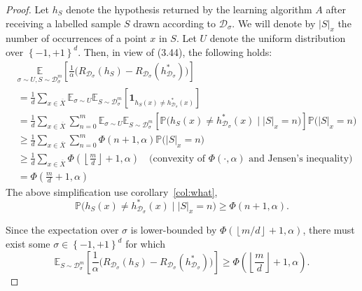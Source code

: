 \begin{proof}
Let $h_{S}$ denote the hypothesis returned by the learning algorithm $A$ after receiving a labelled sample $S$ drawn according to $\mathcal{D}_{\sigma}$. We will denote by $|S|_{x}$ the number of occurrences of a point $x$ in $S$. Let $U$ denote the uniform distribution over $\left\{-1,+1\right\}^{d}$. Then, in view of (3.44), the following holds:
\begin{align}
    &\underset{{\sigma\sim U,S\sim\mathcal{D}_{\sigma}^{m}}}{\mathbb{E}}\left[
\frac{1}{\alpha}\bigl(R_{\mathcal{D}_{\sigma}}(h_S)-R_{\mathcal{D}_{\sigma}}(h^{\ast}_{\mathcal{D}_{\sigma}})\bigr)
\right]\\
&= \frac{1}{d}\sum_{x\in\overline{X}}
\mathbb{E}_{\sigma\sim U}\mathbb{E}_{S\sim\mathcal{D}_{\sigma}^{m}}
\left[ \mathbf{1}_{h_S(x)\neq h^{\ast}_{\mathcal{D}_{\sigma}}(x)} \right]\\
& = \frac{1}{d}\sum_{x\in\overline{X}}
\sum_{n=0}^{m}\mathbb{E}_{\sigma\sim U}\mathbb{E}_{S\sim\mathcal{D}_{\sigma}^{m}}
\left[ \mathbb{P}\bigl(h_S(x)\neq h^{\ast}_{\mathcal{D}_{\sigma}}(x)\mid |S|_{x}=n\bigr)\right]\mathbb{P}\bigl(|S|_{x}=n\bigr)\\
& \ge \frac{1}{d}\sum_{x\in\overline{X}}\sum_{n=0}^{m}\Phi\left(n+1,\alpha\right)\mathbb{P}\bigl(|S|_{x}=n\bigr)\\
&\ge \frac{1}{d}\sum_{x\in\overline{X}}\Phi\left(\left\lfloor\frac{m}{d}\right\rfloor+1,\alpha\right)
\quad\text{(convexity of }\Phi(\cdot,\alpha)\text{ and Jensen's inequality)}\\
& = \Phi\left(\frac{m}{d}+1,\alpha\right)
\end{align}
The above simplification use corollary~\ref{col:what},
\begin{equation}
\mathbb{P}\bigl(h_S(x)\neq h^{\ast}_{\mathcal{D}_{\sigma}}(x)\mid |S|_{x}=n\bigr)
\ge \Phi\left(n+1,\alpha\right).
\end{equation}

Since the expectation over $\sigma$ is lower-bounded by $\Phi\left(\left\lfloor m/d\right\rfloor+1,\alpha\right)$, there must exist some $\sigma\in\left\{-1,+1\right\}^{d}$ for which
\begin{equation}
\mathbb{E}_{S\sim\mathcal{D}_{\sigma}^{m}}\left[
\frac{1}{\alpha}\bigl(R_{\mathcal{D}_{\sigma}}(h_S)-R_{\mathcal{D}_{\sigma}}(h^{\ast}_{\mathcal{D}_{\sigma}})\bigr)
\right]
\ge \Phi\left(\left\lfloor\frac{m}{d}\right\rfloor+1,\alpha\right).
\end{equation}


\end{proof}
